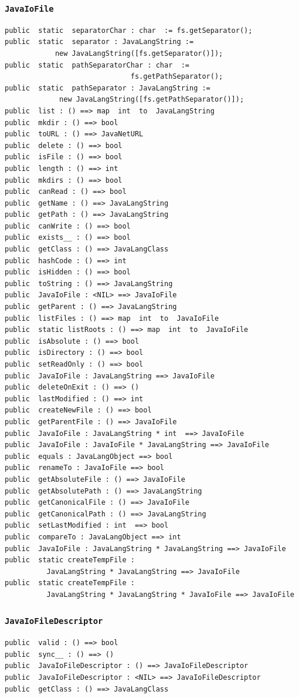 \documentclass[\pformat,12pt]{article}
\begin{document}
\subsubsection{\texttt{JavaIoFile}}
\begin{small}
\begin{verbatim}
public  static  separatorChar : char  := fs.getSeparator();
public  static  separator : JavaLangString := 
            new JavaLangString([fs.getSeparator()]);
public  static  pathSeparatorChar : char  := 
                              fs.getPathSeparator();
public  static  pathSeparator : JavaLangString := 
             new JavaLangString([fs.getPathSeparator()]);
public  list : () ==> map  int  to  JavaLangString
public  mkdir : () ==> bool
public  toURL : () ==> JavaNetURL
public  delete : () ==> bool
public  isFile : () ==> bool
public  length : () ==> int
public  mkdirs : () ==> bool
public  canRead : () ==> bool
public  getName : () ==> JavaLangString
public  getPath : () ==> JavaLangString
public  canWrite : () ==> bool
public  exists__ : () ==> bool
public  getClass : () ==> JavaLangClass
public  hashCode : () ==> int
public  isHidden : () ==> bool
public  toString : () ==> JavaLangString
public  JavaIoFile : <NIL> ==> JavaIoFile
public  getParent : () ==> JavaLangString
public  listFiles : () ==> map  int  to  JavaIoFile
public  static listRoots : () ==> map  int  to  JavaIoFile
public  isAbsolute : () ==> bool
public  isDirectory : () ==> bool
public  setReadOnly : () ==> bool
public  JavaIoFile : JavaLangString ==> JavaIoFile
public  deleteOnExit : () ==> ()
public  lastModified : () ==> int
public  createNewFile : () ==> bool
public  getParentFile : () ==> JavaIoFile
public  JavaIoFile : JavaLangString * int  ==> JavaIoFile
public  JavaIoFile : JavaIoFile * JavaLangString ==> JavaIoFile
public  equals : JavaLangObject ==> bool
public  renameTo : JavaIoFile ==> bool
public  getAbsoluteFile : () ==> JavaIoFile
public  getAbsolutePath : () ==> JavaLangString
public  getCanonicalFile : () ==> JavaIoFile
public  getCanonicalPath : () ==> JavaLangString
public  setLastModified : int  ==> bool
public  compareTo : JavaLangObject ==> int
public  JavaIoFile : JavaLangString * JavaLangString ==> JavaIoFile
public  static createTempFile : 
          JavaLangString * JavaLangString ==> JavaIoFile
public  static createTempFile : 
          JavaLangString * JavaLangString * JavaIoFile ==> JavaIoFile
\end{verbatim}
\end{small}

\subsubsection{\texttt{JavaIoFileDescriptor}}
\begin{small}
\begin{verbatim}
public  valid : () ==> bool
public  sync__ : () ==> ()
public  JavaIoFileDescriptor : () ==> JavaIoFileDescriptor
public  JavaIoFileDescriptor : <NIL> ==> JavaIoFileDescriptor
public  getClass : () ==> JavaLangClass
\end{verbatim}
\end{small}
\end{document}
